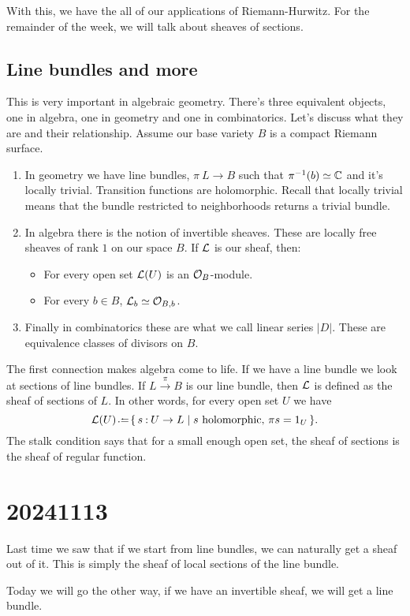 \documentclass[12pt]{memoir}
\begin{document}
With this, we have the all of our applications of Riemann-Hurwitz. For the remainder of the week, we will talk about sheaves of sections. 

\subsection{Line bundles and more}

This is very important in algebraic geometry. There's three equivalent objects, one in algebra, one in geometry and one in combinatorics. Let's discuss what they are and their relationship. Assume our base variety $B$ is a compact Riemann surface. 
\begin{enumerate}
    \item In geometry we have line bundles, $\pi\:L\to B$ such that $\pi^{-1}(b)\simeq\mathbb{C}$ and it's locally trivial. Transition functions are holomorphic. Recall that locally trivial means that the bundle restricted to neighborhoods returns a trivial bundle.
    \item In algebra there is the notion of invertible sheaves. These are locally free sheaves of rank $1$ on our space $B$. If $\mathcal{L}$ is our sheaf, then:
    \begin{itemize}
        \item For every open set $\mathcal{L}(U)$ is an $\mathcal{O}_B$-module.
        \item For every $b\in B$, $\mathcal{L}_b\simeq\mathcal{O}_{B,b}$.
    \end{itemize}
    \item Finally in combinatorics these are what we call linear series $|D|$. These are equivalence classes of divisors on $B$. 
\end{enumerate}

The first connection makes algebra come to life. If we have a line bundle we look at sections of line bundles. If $L\xrightarrow{\pi}B$ is our line bundle, then $\mathcal{L}$ is defined as the sheaf of sections of $L$. In other words, for every open set $U$ we have
$$\cL(U)\defeq \set{s\:U\to L\mid s\text{ holomorphic, }\pi s=1_U}.$$
The stalk condition says that for a small enough open set, the sheaf of sections is the sheaf of regular function. 

\section{20241113}

Last time we saw that if we start from line bundles, we can naturally get a sheaf out of it. This is simply the sheaf of local sections of the line bundle.\par
Today we will go the other way, if we have an invertible sheaf, we will get a line bundle.
\end{document}
